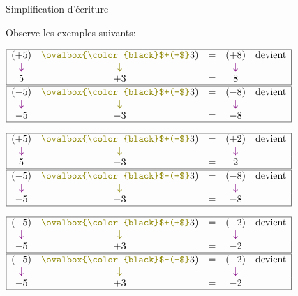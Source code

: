 \documentclass[a4paper,11pt]{report}
\begin{document}

\begin{resolu}{Simplification d'écriture}{Observe les exemples suivants:

\bigskip

$\begin{array}{|ccccc|}\hline
(+5)&{\color{olive}\ovalbox{\color{black}$+(+$}}3)&=&(+8)& \mbox{devient} \\
{\color{violet}\downarrow}&{\color{olive}\downarrow}& & {\color{violet}\downarrow} & \\
5 & +3 & = & 8 & \\\hline
\end{array}$
\hfill
$\begin{array}{|ccccc|}\hline
(-5)&{\color{olive}\ovalbox{\color{black}$+(-$}}3)&=&(-8)& \mbox{devient} \\
{\color{violet}\downarrow}&{\color{olive}\downarrow}& & {\color{violet}\downarrow} & \\
-5 & -3 & = & -8 & \\\hline
\end{array}$

$\begin{array}{|ccccc|}\hline
(+5)&{\color{olive}\ovalbox{\color{black}$+(-$}}3)&=&(+2)& \mbox{devient} \\
{\color{violet}\downarrow}&{\color{olive}\downarrow}& & {\color{violet}\downarrow} & \\
5 & -3 & = & 2 & \\\hline
\end{array}$
\hfill
$\begin{array}{|ccccc|}\hline
(-5)&{\color{olive}\ovalbox{\color{black}$-(+$}}3)&=&(-8)& \mbox{devient} \\
{\color{violet}\downarrow}&{\color{olive}\downarrow}& & {\color{violet}\downarrow} & \\
-5 & -3 & = & -8 & \\\hline
\end{array}$

$\begin{array}{|ccccc|}\hline
(-5)&{\color{olive}\ovalbox{\color{black}$+(+$}}3)&=&(-2)& \mbox{devient} \\
{\color{violet}\downarrow}&{\color{olive}\downarrow}& & {\color{violet}\downarrow} & \\
-5 & +3 & = & -2 & \\\hline
\end{array}$
\hfill
$\begin{array}{|ccccc|}\hline
(-5)&{\color{olive}\ovalbox{\color{black}$-(-$}}3)&=&(-2)& \mbox{devient} \\
{\color{violet}\downarrow}&{\color{olive}\downarrow}& & {\color{violet}\downarrow} & \\
-5 & +3 & = & -2 & \\\hline
\end{array}$

}
\end{resolu}
\end{document}
